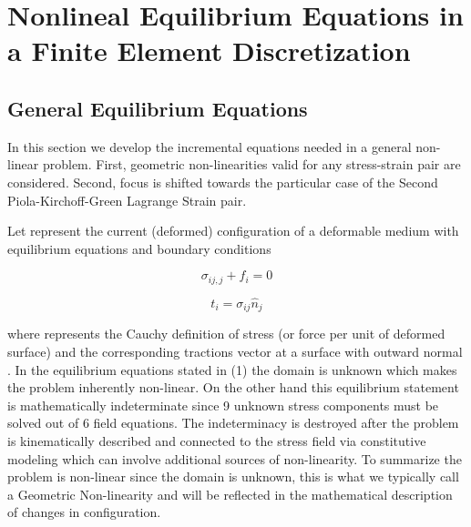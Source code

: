 %
\chapter{Nonlineal Equilibrium Equations in a Finite Element Discretization}

\section{General Equilibrium Equations}
In this section we develop the incremental equations needed in a general non-linear problem.  First, geometric non-linearities valid for any stress-strain pair are considered.  Second, focus is shifted towards the particular case of the Second Piola-Kirchoff-Green Lagrange Strain pair.

Let   represent the current (deformed) configuration of a deformable medium with equilibrium equations and boundary conditions

\begin{equation}
{\sigma _{ij,j}} + {f_i} = 0	 
\end{equation}			

\begin{equation}
{t_i} = {\sigma _{ij}}{\hat n_j}
\end{equation}	 		

where   represents the Cauchy definition of stress (or force per unit of deformed surface) and   the corresponding tractions vector at a surface with outward normal  .  In the equilibrium equations stated in (1) the domain   is unknown which makes the problem inherently non-linear.  On the other hand this equilibrium statement is mathematically indeterminate since 9 unknown stress components must be solved out of 6 field equations.  The indeterminacy is destroyed after the problem is kinematically described and connected to the stress field via constitutive modeling which can involve additional sources of non-linearity.  To summarize the problem is non-linear since the domain   is unknown, this is what we typically call a Geometric Non-linearity and will be reflected in the mathematical description of changes in configuration.



